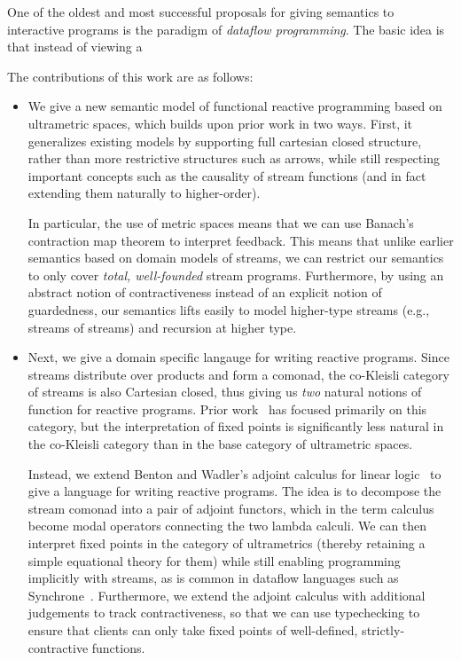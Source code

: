 \documentclass[preprint]{sigplanconf}
\begin{document}
One of the oldest and most successful proposals for giving semantics
to interactive programs is the paradigm of \emph{dataflow programming}. 
The basic idea is that instead of viewing a 



The contributions of this work are as follows:

\begin{itemize}
\item We give a new semantic model of functional reactive programming
  based on ultrametric spaces, which builds upon prior work in two
  ways. First, it generalizes existing models by supporting full
  cartesian closed structure, rather than more restrictive structures
  such as arrows, while still respecting important concepts such as
  the causality of stream functions (and in fact extending them
  naturally to higher-order).

  In particular, the use of metric spaces means that we can use
  Banach's contraction map theorem to interpret feedback. This means
  that unlike earlier semantics based on domain models of streams, we
  can restrict our semantics to only cover \emph{total, well-founded}
  stream programs. Furthermore, by using an abstract notion of
  contractiveness instead of an explicit notion of guardedness, our
  semantics lifts easily to model higher-type streams (e.g., streams
  of streams) and recursion at higher type. 

\item Next, we give a domain specific langauge for writing reactive
  programs. Since streams distribute over products and form a comonad,
  the co-Kleisli category of streams is also Cartesian closed, thus
  giving us \emph{two} natural notions of function for reactive
  programs.  Prior work~\cite{coiterative, essence-dataflow} has
  focused primarily on this category, but the interpretation of fixed
  points is significantly less natural in the co-Kleisli category than
  in the base category of ultrametric spaces.

  Instead, we extend Benton and Wadler's adjoint calculus for linear
  logic~\cite{benton-wadler} to give a language for writing reactive
  programs. The idea is to decompose the stream comonad into a pair of
  adjoint functors, which in the term calculus become modal operators
  connecting the two lambda calculi. We can then interpret fixed
  points in the category of ultrametrics (thereby retaining a simple
  equational theory for them) while still enabling programming
  implicitly with streams, as is common in dataflow languages such as
  Synchrone~\cite{synchrone}. Furthermore, we extend the adjoint
  calculus with additional judgements to track contractiveness, so
  that we can use typechecking to ensure that clients can only take
  fixed points of well-defined, strictly-contractive functions.


\end{itemize}
\end{document}

